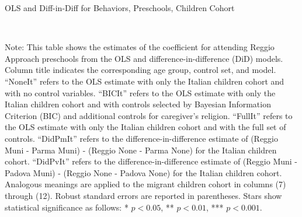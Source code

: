 \begin{landscape}
\begin{table}[H] \caption{OLS and Diff-in-Diff for Behaviors, Preschools, Children Cohort} \label{ols-L-reg}
\scalebox{0.80}{
}
\vspace{1ex} \\
\footnotesize\raggedright{Note: This table shows the estimates of the coefficient for attending Reggio Approach preschools from the OLS and difference-in-difference (DiD) models. Column title indicates the corresponding age group, control set, and model. ``NoneIt'' refers to the OLS estimate with only the Italian children cohort and with no control variables. ``BICIt'' refers to the OLS estimate with only the Italian children cohort and with controls selected by Bayesian Information Criterion (BIC) and additional controls for caregiver's religion. ``FullIt'' refers to the OLS estimate with only the Italian children cohort and with the full set of controls. ``DidPmIt'' refers to the difference-in-difference estimate of (Reggio Muni - Parma Muni) - (Reggio None - Parma None) for the Italian children cohort. ``DidPvIt'' refers to the difference-in-difference estimate of (Reggio Muni - Padova Muni) - (Reggio None - Padova None) for the Italian children cohort.  Analogous meanings are applied to the migrant children cohort in columns (7) through (12). Robust standard errors are reported in parentheses. Stars show statistical significance as follows: * $p < 0.05$, ** $p < 0.01$, *** $p < 0.001$.}
\end{table}



\end{landscape}
